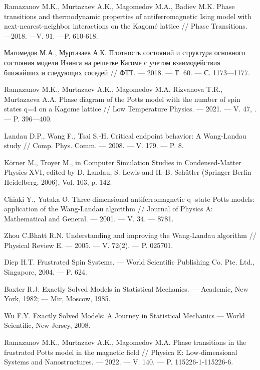 \begin{thebibliography}{111}
Ramazanov M.K., Murtazaev A.K., Magomedov M.A., Badiev M.K.
Phase transitions and thermodynamic properties of antiferromagnetic Ising model with next-nearest-neighbor interactions on the Kagomé lattice
//
Phase Transitions. ---2018. ---V. 91. ---P. 610-618.

Магомедов М.А., Муртазаев А.К.
Плотность состояний и структура основного состояния модели Изинга на решетке Кагоме с учетом взаимодействия ближайших и следующих соседей
//
ФТТ.
--- 2018.
--- Т. 60.
--- С. 1173---1177.

Ramazanov M.K., Murtazaev A.K., Magomedov M.A. Rizvanova T.R., Murtazaeva A.A.
Phase diagram of the Potts model with the number of spin states q=4 on a Kagome lattice
//
Low Temperature Physics.
--- 2021.
--- V. 47, .
--- P. 396---400.

Landau D.P., Wang F., Tsai S.-H.
Critical endpoint behavior: A Wang-Landau study
//
Comp. Phys. Comm.
--- 2008.
--- V. 179.
--- P. 8.

Körner M., Troyer M., in Computer Simulation Studies in Condensed-Matter Physics XVI, edited by D. Landau, S. Lewis and H.-B. Schütler (Springer Berlin Heidelberg, 2006), Vol. 103, p. 142.

Chiaki Y., Yutaka O.
Three-dimensional antiferromagnetic q -state Potts models: application of the Wang-Landau algorithm
//
Journal of Physics A: Mathematical and General.
--- 2001.
--- V. 34.
--- 8781.

Zhou C.Bhatt R.N.
Understanding and improving the Wang-Landau algorithm
//
Physical Review E.
--- 2005.
--- V. 72(2).
--- P. 025701.



Diep H.T.
Frustrated Spin Systems.
--- World Scientific Publishing Co. Pte. Ltd., Singapore, 2004.
--- P. 624.

Baxter R.J.
Exactly Solved Models in Statistical Mechanics.
--- Academic, New York, 1982;
--- Mir, Moscow, 1985.

Wu F.Y.
Exactly Solved Models: A Journey in Statistical Mechanics
--- World Scientific, New Jersey, 2008.

Ramazanov M.K., Murtazaev A.K., Magomedov M.A.
Phase transitions in the frustrated Potts model in the magnetic field
//
Physica E: Low-dimensional Systems and Nanostructures.
--- 2022.
--- V. 140.
--- P. 115226-1-115226-6.


\end{thebibliography}
